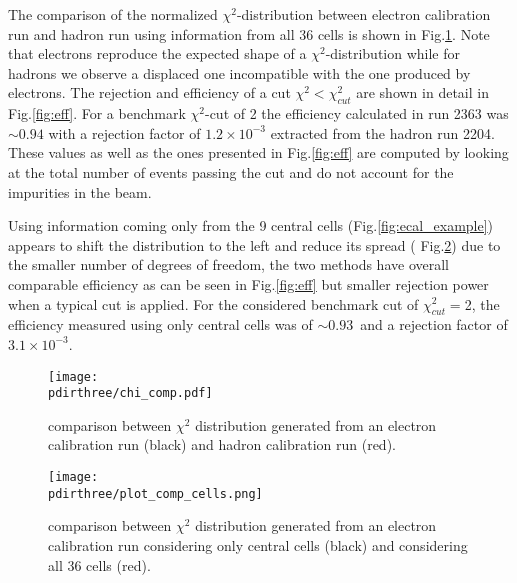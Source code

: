 The comparison of the normalized $\chi^2$-distribution between
electron calibration run and hadron run using information from all 36
cells is shown in Fig.\ref{fig:chi2}. Note that electrons reproduce
the expected shape of a $\chi^2$-distribution while for hadrons we
observe a displaced one incompatible with the one produced by
electrons.  The rejection and efficiency of a cut
$\chi^2 < \chi^2_{cut}$ are shown in detail in Fig.\ref{fig:eff}. For
a benchmark $\chi^2$-cut of 2 the efficiency calculated in run 2363
was $\sim 0.94$ with a rejection factor of $1.2\times 10^{-3}$
extracted from the hadron run 2204. These values as well as the ones
presented in Fig.\ref{fig:eff} are computed by looking at the total
number of events passing the cut and do not account for the impurities
in the beam.

Using information coming only from the 9 central
cells (Fig.\ref{fig:ecal_example}) appears to shift the distribution
to the left and reduce its spread ( Fig.\ref{fig:chi}) due to the
smaller number of degrees of freedom, the two methods have overall
comparable efficiency as can be seen in Fig.\ref{fig:eff} but smaller
rejection power when a typical cut is applied.  For the considered
benchmark cut of $\chi^2_{cut}=$2, the efficiency measured using only
central cells was of $\sim 0.93$\ and a rejection factor of
$3.1\times 10^{-3}$.


\begin{figure}[h!]
  \begin{center}
    \texttt{[image: \\pdirthree/chi\_comp.pdf]}
  \end{center}
  \caption[comparison between $\chi^2$ distribution, electron and hadron calibration run]{comparison between $\chi^2$ distribution generated from an electron calibration run (black) and hadron calibration run (red).}
  \label{fig:chi2}
\end{figure}

\begin{figure}[h!]
  \begin{center}
    \texttt{[image: \\pdirthree/plot\_comp\_cells.png]}
  \end{center}
  \caption[comparison between $\chi^2$ distribution for different ECAL configurations]{comparison between $\chi^2$ distribution generated from an electron calibration run considering only central cells (black) and considering all 36 cells (red).}
  \label{fig:chi}
\end{figure}

